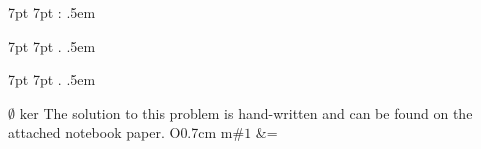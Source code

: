 \usepackage{amsmath}
\usepackage{amssymb}
\usepackage{amsthm}
\usepackage{bm}
\usepackage{enumitem}
\usepackage{graphicx}
\usepackage{mathrsfs}  %
\usepackage{mathtools}
\usepackage{parskip}
\usepackage{xparse}

\newtheorem{theorem}{Theorem}[section]
\newtheorem{corollary}{Corollary}[theorem]
\newtheorem{lemma}{Lemma}

%
   {7pt}%
   {7pt}%
   {}%
   {}%
   {\bfseries}%
   {:}%
   {.5em}%
   {}

%
   {7pt}%
   {7pt}%
   {}%
   {}%
   {\bfseries}%
   {.}%
   {.5em}%
   {}

%
   {7pt}%
   {7pt}%
   {}%
   {}%
   {\itshape}%
   {.}%
   {.5em}%
   {}

\theoremstyle{case}
\newtheorem{case}{Case}

\theoremstyle{claim}
\newtheorem*{claim}{Claim}

\theoremstyle{remark}
\newtheorem*{remark}{Remark}

\makeatletter
\newcommand*{\declarecommand}{%
    \@star@or@long\declare@command
}
\newcommand*{\declare@command}[1]{%
    \provide@command{#1}{}%
    \RenewDocumentCommand{#1}%
}
\makeatother

\renewcommand{\a}{\alpha}
\newcommand{\Bythrm}[1]{By Theorem #1 of the text}
\renewcommand{\b}{\beta}
\newcommand{\bythrm}[1]{by Theorem #1 of the text}
\newcommand{\C}{\mathbb{C}}
\newcommand{\cC}{\mathcal{C}}
\newcommand{\cN}{\mathcal{N}}
\newcommand{\cR}{\mathcal{R}}
\newcommand{\cQ}{\mathcal{Q}}
\newcommand{\cZ}{\mathcal{Z}}
\renewcommand{\cal}[1]{\mathcal{#1}}
\newcommand{\com}[1]{\text{\scriptsize(#1)}}
\renewcommand{\d}{\delta}
\newcommand{\e}{\epsilon}
\declarecommand{\es}{}{\ensuremath{\emptyset}}
\newcommand{\h}[1]{\ensuremath{\hat{#1}}}
\renewcommand{\l}{\ell}
\declarecommand{\ker}{}{\ensuremath{\text{ker}}}
\newcommand{\la}{\leftarrow}
\newcommand{\N}{\mathbb{N}}
\declarecommand{\nb}{}{The solution to this problem is hand-written and can be found on the attached notebook paper.}
\declarecommand{\novs}{O{0.7cm}}{\vspace{-#1}}
\newcommand\numberthis{\addtocounter{equation}{1}\tag{\theequation}}
\newcommand{\R}{\mathbb{R}}
\newcommand{\ra}{\rightarrow}
\newcommand{\s}[1]{\ensuremath{\{#1\}}}
\newcommand{\set}[1]{\ensuremath{\{#1\}}}
\newcommand{\seq}[1]{\left\{#1\right\}_{n=1}^{\infty}}
\newcommand{\struct}[1]{\langle #1 \rangle}
\newcommand{\st}[1]{\ensuremath{\langle #1 \rangle}}
\newcommand{\sub}{\ensuremath{\subset}}
\newcommand{\sube}{\ensuremath{\subseteq}}
\renewcommand{\t}{\theta}
\declarecommand{\tx}{m}{\ensuremath{\text{#1}}}
\newcommand{\vphi}{\varphi}
\newcommand{\Q}{\mathbb{Q}}
\newcommand{\Z}{\mathbb{Z}}
\declarecommand{\=}{}{&=}
